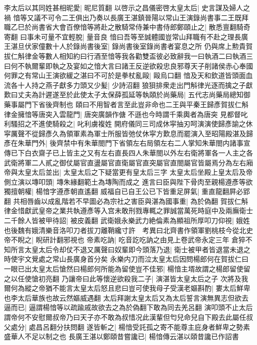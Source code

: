 李太后以其同姓甚相昵愛|{
	昵尼質翻}
以啓示之昌儀密啓太皇太后|{
	史言謀及婦人之禍}
愔等又議不可令二王俱出乃奏以長廣王湛鎮晉陽以常山王演錄尚書事二王既拜職乙巳於尚書省大會百僚愔等將赴之散騎常侍兼中書侍郎鄭頤止之|{
	散悉亶翻騎奇寄翻}
曰事未可量不宜輕脫|{
	量音良}
愔曰吾等至誠體國豈常山拜職有不赴之理長廣王湛旦伏家僮數十人於錄尚書後室|{
	錄尚書後室錄尚書者宴息之所}
仍與席上勲貴賀拔仁斛律金等數人相知約曰行酒至愔等我各勸雙盃彼必致辭我一曰執酒二曰執酒三曰何不執爾輩即執之及宴如之愔大言曰諸王反逆欲殺忠良邪尊天子削諸侯赤心奉國何罪之有常山王演欲緩之湛曰不可於是拳杖亂毆|{
	毆烏口翻}
愔及天和欽道皆頭面血流各十人持之燕子獻多力頭又少髪|{
	少詩沼翻}
狼狽排衆走出門斛律光逐而擒之子獻歎曰丈夫為計遲遂至於此使太子太保薛孤延等執頤於尚藥局|{
	五代志尚藥局總知御藥事屬門下省後齊制也}
頤曰不用智者言至此豈非命也二王與平秦王歸彥賀拔仁斛律金擁愔等唐突入雲龍門|{
	唐突廣韻作傏不遜也今時謂千乘輿者為唐突}
見都督叱利騷招之不進使騎殺之|{
	叱利虜複姓}
開府儀同三司成休寜抽刃呵演演使歸彥諭之休寜厲聲不從歸彥久為領軍素為軍士所服皆弛仗休寜方歎息而罷演入至昭陽殿湛及歸彥在朱華門外|{
	後齊禁中有朱華閤門下省領左右局領左右二人掌知朱華閤内諸事宣傳已下白衣齋子已上皆主之又有左右直長四人朱華閤以外左右衛將軍各一人主之各武衛將軍二人貳之御仗屬官直盪屬官直衛屬官直突屬官直閤屬官皆屬焉分為左右廂}
帝與太皇太后並出|{
	太皇太后之下疑當更有皇太后三字}
太皇太后坐殿上皇太后及帝側立演以塼叩頭|{
	塼朱緣翻範土為塼陶而成之}
進言曰臣與陛下骨肉至親楊遵彥等欲獨擅朝權|{
	楊愔字遵彥朝直遙翻}
威福自已自王公已下皆重足屏氣|{
	重直龍翻屛必郢翻}
共相唇齒以成亂階若不早圖必為宗社之害臣與湛為國事重|{
	為於偽翻}
賀拔仁斛律金惜獻武皇帝之業共執遵彥等入宫未敢刑戮專輒之罪誠當萬死時庭中及兩廡衛士二千餘人皆被甲待詔|{
	被皮義翻}
武衛娥永樂武力絶倫素為顯祖所厚叩刀仰視|{
	娥姓也後魏有娥清樂音洛叩刀者拔刀離鞘纔寸許　考異曰北齊書作領軍劉桃枝今從北史}
帝不睨之|{
	睨研計翻邪視也}
帝素吃訥|{
	吃音訖吃訥之由見上卷武帝永定三年}
倉猝不知所言太皇太后令却仗不退又厲聲曰奴輩即今頭落乃退|{
	衛士被甲者皆退當未退之時使宇文覺處之常山長廣身首分矣}
永樂内刀而泣太皇太后因問楊郎何在賀拔仁曰一眼已出太皇太后愴然曰楊郎何所能為留使豈不佳邪|{
	楊愔主壻故謂之楊郎留使留之以任使愴初亮翻}
乃讓帝曰此等懷逆欲殺我二子|{
	演湛皆太皇太后之子}
次將及我爾何為縱之帝猶不能言太皇太后怒且悲曰豈可使我母子受漢老嫗斟酌|{
	婁太后鮮卑也李太后華族也故云然嫗威遇翻}
太后拜謝太皇太后又為太后誓言演無異志但欲去逼而已|{
	逼謂楊愔等以疏踰戚故欲去之為於偽翻下敢為同去羌呂翻}
演叩頭不止太后謂帝何不安慰爾叔帝乃曰天子亦不敢為叔惜况此漢輩但匄兒命兒自下殿去此屬任叔父處分|{
	處昌呂翻分扶問翻}
遂皆斬之|{
	楊愔受託孤之寄不能尊主庇身者鮮卑之勢素盛華人不足以制之也}
長廣王湛以鄭頤昔嘗讒已|{
	楊愔傳云湛以頤昔讒已作詔書}
